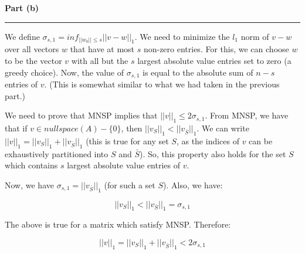 \documentclass[a4paper,12pt]{article}
\newenvironment{solution}[2][]{%
    \begin{mdframed}[linecolor=blue!70!black, linewidth=2pt, roundcorner=10pt, backgroundcolor=yellow!10!white, skipabove=12pt, skipbelow=12pt]%
        \textbf{\large #2}
        \par\noindent\rule{\textwidth}{0.4pt}
}{
    \end{mdframed}
}
\begin{document}
\begin{solution}{Part (b)}
  We define $\sigma_{s,1} = inf_{||w_0|| \leq s}||v-w||_1$. We need to minimize the $l_1$ norm of $v-w$ over all vectors $w$ that have at most $s$ non-zero entries. For this, we can choose $w$ to be the vector $v$ with all but the $s$ largest absolute value entries set to zero (a greedy choice). Now, the value of $\sigma_{s,1}$ is equal to the absolute sum of $n-s$ entries of $v$. (This is somewhat similar to what we had taken in the previous part.)

  We need to prove that MNSP implies that $||v||_1 \leq 2\sigma_{s,1}$. From MNSP, we have that if $v \in nullspace(A) - \{0\}$, then $||v_S||_1 < ||v_{\bar{S}}||_1$. We can write $||v||_1 = ||v_S||_1 + ||v_{\bar{S}}||_1$ (this is true for any set $S$, as the indices of $v$ can be  exhaustively partitioned into $S$ and $\bar{S}$). So, this property also holds for the set $S$ which contains $s$ largest absolute value entries of $v$. 

  Now, we have $\sigma_{s,1} = ||v_{\bar{S}}||_1$ (for such a set $S$). Also, we have:

  \[
    ||v_S||_1 < ||v_{\bar{S}}||_1 = \sigma_{s,1}
  \]

  The above is true for a matrix which satisfy MNSP. Therefore:

  \[
    ||v||_1 = ||v_S||_1 + ||v_{\bar{S}}||_1 < 2\sigma_{s,1}
  \]
\end{solution}
\end{document}

